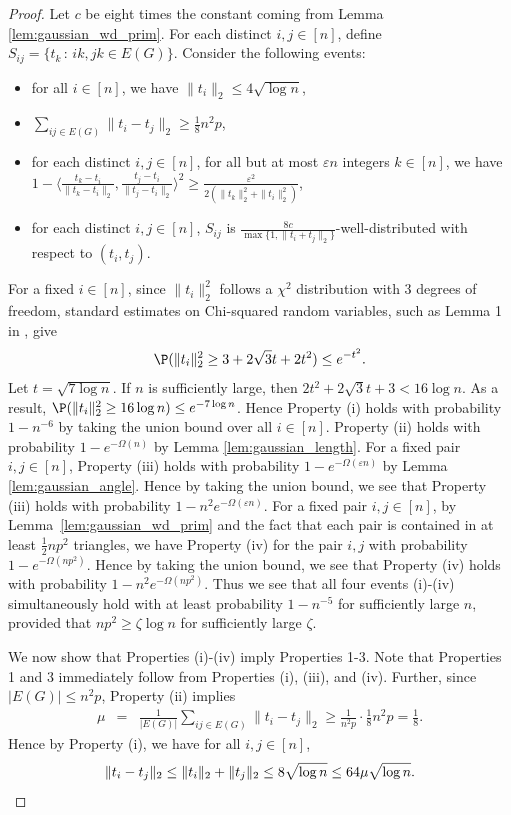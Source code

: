 \begin{proof}
Let $c$ be eight times the constant coming from Lemma \ref{lem:gaussian_wd_prim}.
For each distinct $i,j\in[n]$, define $S_{ij}=\{t_{k}\,:\, ik,jk\in E(G)\}$.
Consider the following events:
\begin{itemize}
  \setlength{\itemsep}{1pt} \setlength{\parskip}{0pt}
  \setlength{\parsep}{0pt}
\item[(i)] for all $i\in[n]$, we have $\|t_i\|_2 \le  4\sqrt{\log n}$,
\item[(ii)] $\sum_{ij \in E(G)} \|t_i - t_j \|_2 \ge \frac{1}{8}n^2p$, %
\item[(iii)] for each distinct $i,j \in [n]$, for all but at most $\varepsilon n$ integers $k \in [n]$, we have $1 - \langle \frac{t_k - t_i}{\|t_k - t_i \|_2}, \frac{t_j - t_i}{\|t_j - t_i\|_2} \rangle^2 \ge \frac{\varepsilon^2}{2(\|t_k\|_2^2 + \|t_i\|_2^2)}$,
\item[(iv)] for each distinct $i,j\in[n]$, $S_{ij}$ is $\frac{8c}{\max\{1,\|t_i+t_j\|_2\}}$-well-distributed with respect to $(t_i,t_j)$.
\end{itemize}
For a fixed $i \in [n]$, since $\|t_i\|_2^2$ follows a $\chi^2$ distribution with $3$ degrees of freedom, 
standard estimates on Chi-squared random variables, such as Lemma 1 in \cite{LaurentMassart}, give
\[
\P( \|t_i\|_2^2 \geq 3 + 2 \sqrt{3}t + 2t^2 ) \leq e^{-t^2}.
\]
Let $t = \sqrt{7 \log n}$. 
If $n$ is sufficiently large, then 
$2t^2 + 2 \sqrt{3} t + 3 < 16 \log n$. 
As a result, $\P(\|t_i\|_2^2 \geq 16 \log n) \leq e^{-7 \log n}$.
Hence
Property (i) holds with probability $1-n^{-6}$ by taking the union
bound over all $i \in [n]$. 
Property (ii) holds with probability $1-e^{-\Omega(n)}$ by
Lemma \ref{lem:gaussian_length}. For a fixed pair $i,j\in[n]$, Property
(iii) holds with probability $1-e^{-\Omega(\varepsilon n)}$ by Lemma \ref{lem:gaussian_angle}.
Hence by taking the union bound, we see that Property (iii) holds
with probability $1-n^{2}e^{-\Omega(\varepsilon n)}$. For a fixed pair $i,j\in[n]$,
by Lemma~\ref{lem:gaussian_wd_prim}
and the fact that each pair is contained in at least $\frac{1}{2}np^2$ triangles, 
we have Property (iv) for the pair $i,j$
with probability $1-e^{-\Omega(np^2)}$. Hence by taking
the union bound, we see that Property (iv) holds with probability
$1-n^{2}e^{-\Omega(np^2)}$. 
Thus we see that all four
events (i)-(iv) simultaneously hold with at least probability $1-n^{-5}$ for sufficiently large $n$, provided that $np^2 \geq \zeta \log n$ for sufficiently large $\zeta$.

We now show that Properties (i)-(iv) imply Properties 1-3. Note that
Properties 1 and 3 immediately follow from Properties (i), (iii), and
(iv). Further, since $|E(G)|\le n^2p$, Property (ii) implies
\begin{eqnarray*}
	\mu & = & \frac{1}{|E(G)|}\sum_{ij\in E(G)}\|t_{i}-t_{j}\|_2
	\ge\frac{1}{n^2p} \cdot \frac{1}{8}n^2 p = \frac{1}{8}.
\end{eqnarray*}
Hence by Property (i), we have for all $i,j\in[n]$, 
\[
	\|t_{i}-t_{j}\|_2
	\le \|t_{i}\|_2+\|t_{j}\|_2
	\le 8\sqrt{\log n}\le 64\mu \sqrt{\log n}.\qedhere
\]
\end{proof}




